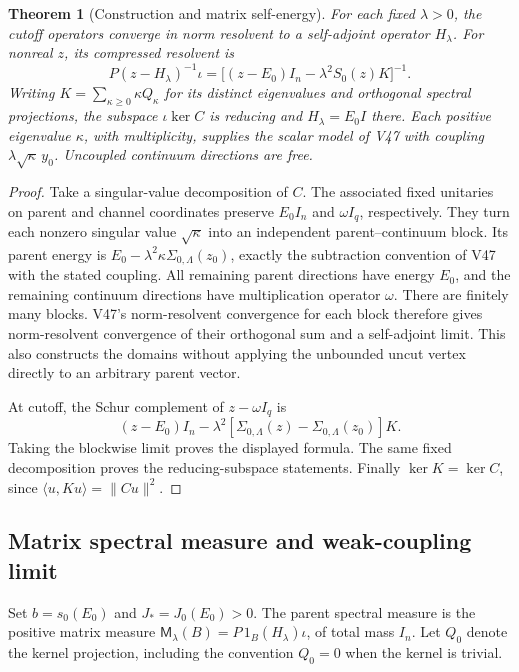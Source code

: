 \documentclass[11pt]{article}
\newtheorem{theorem}{Theorem}[section]
\theoremstyle{remark}
\begin{document}
\begin{theorem}[Construction and matrix self-energy]
\label{thm:v20v52-construction}
For each fixed \(\lambda>0\), the cutoff operators converge in
norm resolvent to a self-adjoint operator \(H_\lambda\).
For nonreal \(z\), its compressed resolvent is
\[
 P(z-H_\lambda)^{-1}\iota
   =\big[(z-E_0)I_n-\lambda^2 S_0(z)K\big]^{-1}.
\]
Writing \(K=\sum_{\kappa\geq0}\kappa Q_\kappa\) for its distinct
eigenvalues and orthogonal spectral projections, the subspace
\(\iota\ker C\) is reducing and \(H_\lambda=E_0I\) there.
Each positive eigenvalue \(\kappa\), with multiplicity, supplies
the scalar model of V47 with coupling \(\lambda\sqrt{\kappa}\,y_0\).
Uncoupled continuum directions are free.
\end{theorem}
\begin{proof}
Take a singular-value decomposition of \(C\).
The associated fixed unitaries on parent and channel coordinates
preserve \(E_0I_n\) and \(\omega I_q\), respectively.
They turn each nonzero singular value \(\sqrt{\kappa}\)
into an independent parent--continuum block.  Its parent energy is
\(E_0-\lambda^2\kappa\Sigma_{0,\Lambda}(z_0)\), exactly the
subtraction convention of V47 with the stated coupling.
All remaining parent directions have energy \(E_0\), and the
remaining continuum directions have multiplication operator
\(\omega\).  There are finitely many blocks.  V47's norm-resolvent
convergence for each block therefore gives norm-resolvent
convergence of their orthogonal sum and a self-adjoint limit.
This also constructs the domains without applying the unbounded
uncut vertex directly to an arbitrary parent vector.

At cutoff, the Schur complement of \(z-\omega I_q\) is
\[
 (z-E_0)I_n-\lambda^2
       [\Sigma_{0,\Lambda}(z)-\Sigma_{0,\Lambda}(z_0)]K .
\]
Taking the blockwise limit proves the displayed formula.
The same fixed decomposition proves the reducing-subspace
statements.  Finally \(\ker K=\ker C\), since
\(\langle u,Ku\rangle=\|Cu\|^2\).
\end{proof}

\subsection{Matrix spectral measure and weak-coupling limit}

Set \(b=s_0(E_0)\) and \(J_*=J_0(E_0)>0\).
The parent spectral measure is the positive matrix measure
\(\mathsf M_\lambda(B)=P\,1_B(H_\lambda)\iota\), of total mass
\(I_n\).  Let \(Q_0\) denote the kernel projection, including
the convention \(Q_0=0\) when the kernel is trivial.
\end{document}
